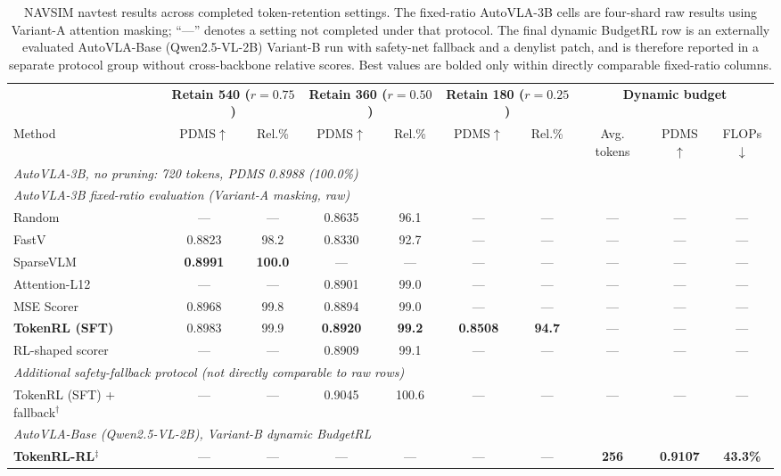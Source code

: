 \documentclass[letterpaper]{article} %
\newcommand{\ours}{TokenRL}
\begin{document}
\begin{table}[t]
\centering
\small
\caption{NAVSIM navtest results across completed token-retention settings. The fixed-ratio AutoVLA-3B cells are four-shard raw results using Variant-A attention masking; ``---'' denotes a setting not completed under that protocol. The final dynamic BudgetRL row is an externally evaluated AutoVLA-Base (Qwen2.5-VL-2B) Variant-B run with safety-net fallback and a denylist patch, and is therefore reported in a separate protocol group without cross-backbone relative scores. Best values are bolded only within directly comparable fixed-ratio columns.}
\label{tab:main}
\setlength{\tabcolsep}{4.2pt}
\begin{tabular}{@{}l cc cc cc ccc@{}}
\toprule
& \multicolumn{2}{c}{\textbf{Retain 540 ($r{=}0.75$)}}
& \multicolumn{2}{c}{\textbf{Retain 360 ($r{=}0.50$)}}
& \multicolumn{2}{c}{\textbf{Retain 180 ($r{=}0.25$)}}
& \multicolumn{3}{c}{\textbf{Dynamic budget}} \\
\cmidrule(lr){2-3}\cmidrule(lr){4-5}\cmidrule(lr){6-7}\cmidrule(lr){8-10}
Method & PDMS$\uparrow$ & Rel.\%
& PDMS$\uparrow$ & Rel.\%
& PDMS$\uparrow$ & Rel.\%
& Avg. tokens & PDMS$\uparrow$ & FLOPs$\downarrow$ \\
\midrule
\multicolumn{10}{l}{\textit{AutoVLA-3B, no pruning: 720 tokens, PDMS 0.8988 (100.0\%)}} \\
\midrule
\multicolumn{10}{l}{\textit{AutoVLA-3B fixed-ratio evaluation (Variant-A masking, raw)}} \\
Random & --- & --- & 0.8635 & 96.1 & --- & --- & --- & --- & --- \\
FastV~\citep{fastv2024} & 0.8823 & 98.2 & 0.8330 & 92.7 & --- & --- & --- & --- & --- \\
SparseVLM~\citep{sparsevlm2025} & \textbf{0.8991} & \textbf{100.0} & --- & --- & --- & --- & --- & --- & --- \\
Attention-L12 & --- & --- & 0.8901 & 99.0 & --- & --- & --- & --- & --- \\
MSE Scorer & 0.8968 & 99.8 & 0.8894 & 99.0 & --- & --- & --- & --- & --- \\
\textbf{\ours{} (SFT)} & 0.8983 & 99.9 & \textbf{0.8920} & \textbf{99.2} & \textbf{0.8508} & \textbf{94.7} & --- & --- & --- \\
RL-shaped scorer & --- & --- & 0.8909 & 99.1 & --- & --- & --- & --- & --- \\
\midrule
\multicolumn{10}{l}{\textit{Additional safety-fallback protocol (not directly comparable to raw rows)}} \\
\ours{} (SFT) + fallback$^{\dagger}$ & --- & --- & 0.9045 & 100.6 & --- & --- & --- & --- & --- \\
\midrule
\multicolumn{10}{l}{\textit{AutoVLA-Base (Qwen2.5-VL-2B), Variant-B dynamic BudgetRL}} \\
\textbf{\ours{}-RL}$^{\ddagger}$ & --- & --- & --- & --- & --- & --- & \textbf{256} & \textbf{0.9107} & \textbf{43.3\%} \\
\bottomrule
\end{tabular}


\end{table}
\end{document}
